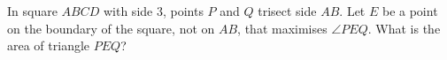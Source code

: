 In square $ABCD$ with side $3$, points $P$ and $Q$ trisect side $AB$. Let $E$ be a point on the boundary of the square, not on $AB$, that maximises $\angle PEQ$. What is the area of triangle $PEQ$?
